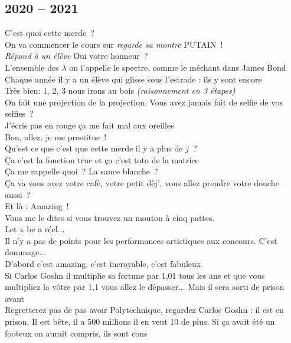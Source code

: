 \documentclass[french, a4paper, openany]{book}
\begin{document}
	\subsection*{2020 -- 2021}

	\noindent \og C'est quoi cette merde~? \fg \\
	\og On va commencer le cours sur \emph{regarde sa montre} PUTAIN~! \fg \\
	\emph{Répond à un élève} \og Oui votre honneur~? \fg \\
	\og L'ensemble des $\lambda$ on l'appelle le spectre, comme le méchant dans James Bond \fg \\
	\og Chaque année il y a un élève qui glisse sous l'estrade : ils y sont encore \fg \\
	\og Très bien: 1, 2, 3 nous irons au bois \fg \emph{(raisonnement en 3 étapes)} \\
	\og On fait une projection de la projection. Vous avez jamais fait de selfie de vos selfies~? \fg \\
	\og J'écris pas en rouge ça me fait mal aux oreilles \fg \\
	\og Bon, allez, je me prostitue~! \fg \\
	\og Qu'est ce que c'est que cette merde il y a plus de $j$~? \fg \\
	\og Ça c'est la fonction truc et ça c'est toto de la matrice \fg \\
	\og Ça me rappelle quoi~? La sauce blanche~? \fg \\
	\og Ça va vous avez votre café, votre petit dèj', vous allez prendre votre douche aussi~? \fg \\
	\og Et là : Amazing~! \fg \\
	\og Vous me le dites si vous trouvez un mouton à cinq pattes. \fg \\
	\og Let x be a réel... \fg \\
	\og Il n'y a pas de points pour les performances artistiques aux concours. C'est dommage... \fg \\
	\og D'abord c'est amazing, c'est incroyable, c'est fabuleux \fg \\
	\og Si Carlos Goshn il multiplie sa fortune par 1,01 tous les ans et que vous multipliez la vôtre par 1,1 vous allez le dépasser... Mais il sera sorti de prison avant \fg \\
	\og Regretterez pas de pas avoir Polytechnique, regardez Carlos Goshn : il est en prison. Il est bête, il a 500 millions il en veut 10 de plus. Si ça avait été un footeux on aurait compris, ils sont cons \fg \\
\end{document}
